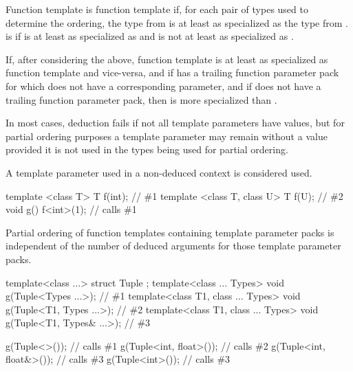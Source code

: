 \pnum
{}%
Function template 
is 
function template  if,
for each pair of types used to determine the ordering,
the type from 
is at least as specialized as
the type from .
is 
 if
is at least as specialized as
 and
is not at least as specialized as
.

\pnum
If, after considering the above, function template 
is at least as specialized as function template  and vice-versa, and
if  has a trailing function parameter pack
for which  does not have a corresponding parameter, and
if  does not have a trailing function parameter pack,
then  is more specialized than .

\pnum
In most cases,
deduction fails if not all template parameters have values,
but for partial ordering purposes a template
parameter may remain without a value provided it is not used in the
types being used for partial ordering.
\begin{note}
A template parameter used in a non-deduced context is considered used.
\end{note}
\begin{example}
\begin{codeblock}
template <class T> T f(int);            // \#1
template <class T, class U> T f(U);     // \#2
void g() {
  f<int>(1);                            // calls \#1
}
\end{codeblock}
\end{example}

\pnum
\begin{note}
Partial ordering of function templates containing
template parameter packs is independent of the number of deduced arguments
for those template parameter packs.
\end{note}
\begin{example}
\begin{codeblock}
template<class ...> struct Tuple { };
template<class ... Types> void g(Tuple<Types ...>);                 // \#1
template<class T1, class ... Types> void g(Tuple<T1, Types ...>);   // \#2
template<class T1, class ... Types> void g(Tuple<T1, Types& ...>);  // \#3

g(Tuple<>());                   // calls \#1
g(Tuple<int, float>());         // calls \#2
g(Tuple<int, float&>());        // calls \#3
g(Tuple<int>());                // calls \#3
\end{codeblock}
\end{example}

